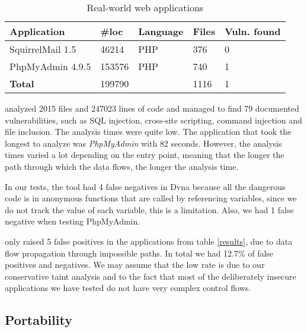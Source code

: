 \begin{table*}[htbp]
    \caption{Real-world web applications}
    \begin{center}
        \begin{tabular}{|l|| l | l  |l | l |}
            \hline
            \textbf{Application}  & \textbf{\#loc}      & \textbf{Language}      & \textbf{Files}     & \textbf{Vuln. found} \\ [0.5ex] 
            \hline\hline   
             SquirrelMail 1.5     & 46214     & PHP        & 376         & 0 \\ 
            \hline
             PhpMyAdmin 4.9.5     & 153576    & PHP        & 740        & 1 \\  [0.5ex]    
            \hline\hline   
            \textbf{Total}        & 199790 &              &  1116 &  1 \\
            \hline
        \end{tabular}
    \label{results1}
    \end{center}
\end{table*}


\toolname{} analyzed 2015 files and 247023 lines of code and managed to find 79 documented vulnerabilities, such as SQL injection, cross-site scripting, command injection and file inclusion. The analysis times were quite low. The application that took the longest to analyze was \textit{PhpMyAdmin} with 82 seconds. However, the analysis times varied a lot depending on the entry point, meaning that the longer the path through which the data flows, the longer the analysis time.

In our tests, the tool had 4 false negatives in Dvna because all the dangerous code is in anonymous functions that are called by referencing variables, since we do not track the value of each variable, this is a limitation. Also, we had 1 false negative when testing PhpMyAdmin.

\toolname{} only raised 5 false positives in the applications from table \ref{results}, due to data flow propagation through impossible paths. In total we had 12.7\% of false positives and negatives. We may assume that the low rate is due to our conservative taint analysis and to the fact that most of the deliberately insecure applications we have tested do not have very complex control flows.


\subsection{Portability}

